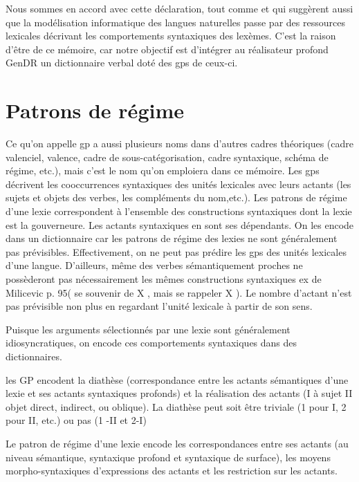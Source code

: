 Nous sommes en accord avec cette déclaration, tout comme \cite{Korhonenlargesubcategorizationlexicon2006} et \cite{MESSIANT08.142} qui suggèrent aussi que la modélisation informatique des langues naturelles passe par des ressources lexicales décrivant les comportements syntaxiques des lexèmes.  C'est la raison d'être de ce mémoire, car notre objectif est d'intégrer au réalisateur profond GenDR  un dictionnaire verbal doté des \acp{gp} de ceux-ci.

\section{Patrons de régime}\label{sec:gp}

Ce qu'on appelle \ac{gp} a aussi plusieurs noms dans d'autres cadres théoriques (cadre valenciel, valence, cadre de sous-catégorisation, cadre syntaxique, schéma de régime, etc.), mais c'est le nom qu'on emploiera dans ce mémoire. Les \acp{gp} décrivent les cooccurrences syntaxiques des unités lexicales \citep{MilicevicSchemaregimepont2009} avec leurs actants (les sujets et objets des verbes, les compléments du nom,etc.). Les patrons de régime d'une lexie correspondent à l'ensemble des constructions syntaxiques dont la lexie est la gouverneure. Les actants syntaxiques en sont ses dépendants. On les encode dans un dictionnaire car les patrons de régime des lexies ne sont généralement pas prévisibles. Effectivement, on ne peut pas prédire les \acp{gp} des unités lexicales d'une langue. D'ailleurs, même des verbes sémantiquement proches ne possèderont pas nécessairement les mêmes constructions syntaxiques ex de Milicevic p. 95( se souvenir de X , mais se rappeler X ). Le nombre d'actant n'est pas prévisible non plus en regardant l'unité lexicale à partir de son sens. 

Puisque les arguments sélectionnés par une lexie sont généralement idiosyncratiques, on encode ces comportements syntaxiques dans des dictionnaires.

les GP encodent la diathèse (correspondance entre les actants sémantiques d'une lexie et ses actants syntaxiques profonds) et la réalisation des actants (I à sujet II objet direct, indirect, ou oblique). La diathèse peut soit être triviale (1 pour I, 2 pour II, etc.) ou pas (1 -II et 2-I)

Le patron de régime d'une lexie encode les correspondances entre ses actants (au niveau sémantique, syntaxique profond et syntaxique de surface), les moyens morpho-syntaxiques d'expressions des actants et les restriction sur les actants.

